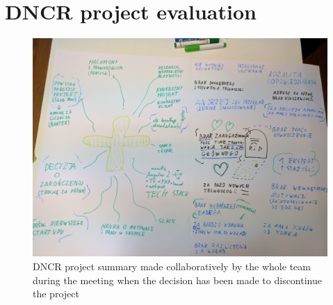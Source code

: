 \documentclass{article}
\begin{document}
\section{DNCR project evaluation}
\begin{figure}[h]
    \includegraphics[width=\textwidth]{dncr-funeral}
    \caption{DNCR project summary made collaboratively by the whole team during the meeting when the decision has been made to discontinue the project}
    \label{fig:dncr-funeral}
\end{figure}
\FloatBarrier
\end{document}
